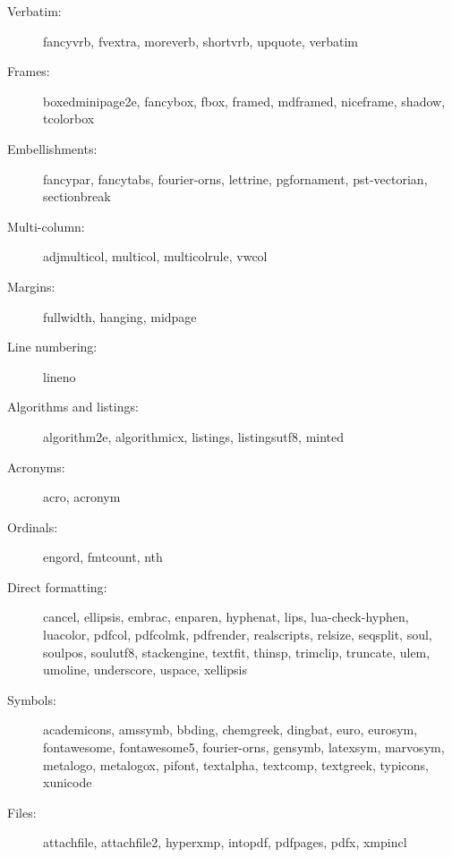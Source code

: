 \documentclass{article}
\def\pkg#1{#1}%
\renewcommand*{\pkg}[1]{#1}
\begin{document}
\begin{multicols}{2}
\begin{description}
\item[Verbatim:] \pkg{fancyvrb}, \pkg{fvextra}, \pkg{moreverb}, \pkg{shortvrb},
    \pkg{upquote}, \pkg{verbatim}

\item[Frames:] \pkg{boxedminipage2e}, \pkg{fancybox}, \pkg{fbox}, \pkg{framed},
    \pkg{mdframed}, \pkg{niceframe}, \pkg{shadow}, \pkg{tcolorbox}

\item[Embellishments:] \pkg{fancypar}, \pkg{fancytabs}, \pkg{fourier-orns},
    \pkg{lettrine}, \pkg{pgfornament}, \pkg{pst-vectorian}, \pkg{sectionbreak}

\item[Multi-column:] \pkg{adjmulticol}, \pkg{multicol}, \pkg{multicolrule}, \pkg{vwcol}

\item[Margins:] \pkg{fullwidth}, \pkg{hanging}, \pkg{midpage}

\item[Line numbering:] \pkg{lineno}

\item[Algorithms and listings:] \pkg{algorithm2e}, \pkg{algorithmicx},
    \pkg{listings}, \pkg{listingsutf8}, \pkg{minted}

\item[Acronyms:] \pkg{acro}, \pkg{acronym}

\item[Ordinals:] \pkg{engord}, \pkg{fmtcount}, \pkg{nth}

\item[Direct formatting:]
    \pkg{cancel}, \pkg{ellipsis}, \pkg{embrac}, \pkg{enparen},
    \pkg{hyphenat}, \pkg{lips},
    \pkg{lua-check-hyphen}, \pkg{luacolor},
    \pkg{pdfcol}, \pkg{pdfcolmk},
    \pkg{pdfrender}, \pkg{realscripts}, \pkg{relsize},
    \pkg{seqsplit}, \pkg{soul}, \pkg{soulpos},
    \pkg{soulutf8}, \pkg{stackengine},
    \pkg{textfit}, \pkg{thinsp}, \pkg{trimclip}, \pkg{truncate},
    \pkg{ulem}, \pkg{umoline}, \pkg{underscore}, \pkg{uspace},
    \pkg{xellipsis}

\item[Symbols:] \pkg{academicons}, \pkg{amssymb}, \pkg{bbding},
    \pkg{chemgreek}, \pkg{dingbat}, \pkg{euro}, \pkg{eurosym},
    \pkg{fontawesome}, \pkg{fontawesome5}, \pkg{fourier-orns},
    \pkg{gensymb}, \pkg{latexsym},
    \pkg{marvosym},  \pkg{metalogo}, \pkg{metalogox},
    \pkg{pifont},  \pkg{textalpha},  \pkg{textcomp}, \pkg{textgreek},
    \pkg{typicons}, \pkg{xunicode}

\item[Files:]
    \pkg{attachfile}, \pkg{attachfile2}, \pkg{hyperxmp},
    \pkg{intopdf}, \pkg{pdfpages}, \pkg{pdfx}, \pkg{xmpincl}


\end{description}
\end{multicols}
\end{document}
